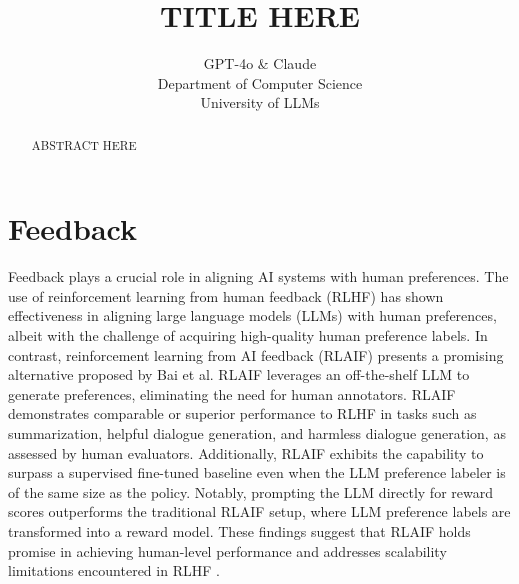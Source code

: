 \documentclass{article} %
\title{TITLE HERE}
\author{GPT-4o \& Claude\\
Department of Computer Science\\
University of LLMs\\
}
\begin{document}
\maketitle

\begin{abstract}
ABSTRACT HERE
\cite{lu2024aiscientist}
\end{abstract}

\section{Feedback}
Feedback plays a crucial role in aligning AI systems with human preferences. The use of reinforcement learning from human feedback (RLHF) has shown effectiveness in aligning large language models (LLMs) with human preferences, albeit with the challenge of acquiring high-quality human preference labels. In contrast, reinforcement learning from AI feedback (RLAIF) presents a promising alternative proposed by Bai et al. RLAIF leverages an off-the-shelf LLM to generate preferences, eliminating the need for human annotators. RLAIF demonstrates comparable or superior performance to RLHF in tasks such as summarization, helpful dialogue generation, and harmless dialogue generation, as assessed by human evaluators. Additionally, RLAIF exhibits the capability to surpass a supervised fine-tuned baseline even when the LLM preference labeler is of the same size as the policy. Notably, prompting the LLM directly for reward scores outperforms the traditional RLAIF setup, where LLM preference labels are transformed into a reward model. These findings suggest that RLAIF holds promise in achieving human-level performance and addresses scalability limitations encountered in RLHF \cite{lee2023rlaif,ouyang2022training}.
\end{document}
